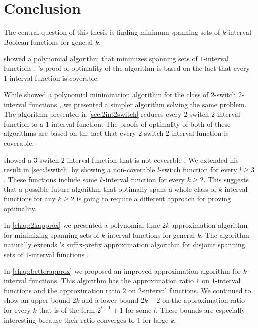 \chapter*{Conclusion}


The central question of this thesis
is finding minimum spanning sets
of $k$-interval Boolean functions
for general $k$.

\citeauthor{Schieber2005154} showed a polynomial algorithm
that minimizes spanning sets of $1$-interval functions
\citep[Section 3]{Schieber2005154}.
\citeauthor{Schieber2005154}'s proof of optimality
of the algorithm
is based on the fact that every $1$-interval function
is coverable.

While \citeauthor{Dubovsky2012} showed
a polynomial minimization algorithm
for the class of $2$-switch $2$-interval functions
\citep[Section 4]{Dubovsky2012},
we presented a simpler algorithm
solving the same problem.
The algorithm presented in \cref{sec:2int2switch}
reduces every $2$-switch $2$-interval function
to a $1$-interval function.
The proofs of optimality of both of these algorithms
are based on the fact that every $2$-switch $2$-interval
function is coverable.

\citeauthor{Dubovsky2012} showed
a $3$-switch $2$-interval function
that is not coverable
\citep[p.~32]{Dubovsky2012}.
We extended his result
in \cref{sec:3switch}
by showing
a non-coverable $l$-switch function for every $l \geq 3$.
These functions include some $k$-interval function
for every $k \geq 2$.
This suggests that a possible future algorithm
that optimally spans a whole class
of $k$-interval functions
for any $k \geq 2$
is going to require a different approach
for proving optimality.

In \cref{chap:2kapprox}
we presented
a polynomial-time
$2k$-approximation algorithm
for minimizing spanning sets
of $k$-interval functions for general $k$.
The algorithm naturally extends
\citeauthor{Schieber2005154}'s suffix-prefix
approximation algorithm
for disjoint spanning sets of $1$-interval functions
\citep[Section 6]{Schieber2005154}.

In \cref{chap:betterapprox}
we proposed an improved approximation algorithm
for $k$-interval functions.
This algorithm has the approximation ratio $1$
on $1$-interval functions
and the approximation ratio $2$
on $2$-interval functions.
We continued to show an upper bound $2k$
and a lower bound $2k-2$
on the approximation ratio
for every $k$ that is of the form $2^{l-1}+1$
for some $l$.
These bounds are especially interesting
because their ratio converges to $1$
for large $k$.

